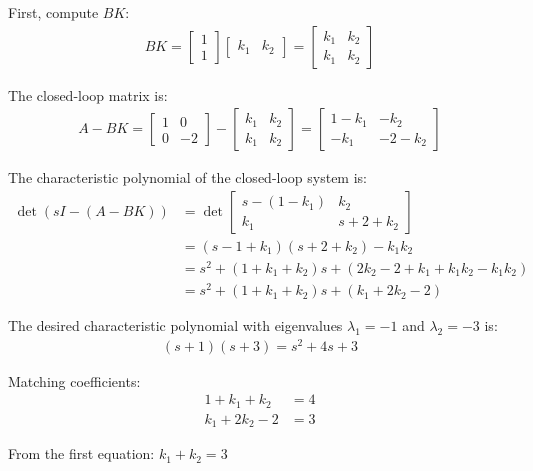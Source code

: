 \documentclass[11pt,a4paper]{article}
\begin{document}
First, compute $BK$:
\begin{align}
  BK = \begin{bmatrix} 1 \\ 1 \end{bmatrix}\begin{bmatrix} k_1 & k_2 \end{bmatrix} = \begin{bmatrix} k_1 & k_2 \\ k_1 & k_2 \end{bmatrix}
\end{align}

The closed-loop matrix is:
\begin{align}
  A - BK = \begin{bmatrix} 1 & 0 \\ 0 & -2 \end{bmatrix} - \begin{bmatrix} k_1 & k_2 \\ k_1 & k_2 \end{bmatrix} = \begin{bmatrix} 1-k_1 & -k_2 \\ -k_1 & -2-k_2 \end{bmatrix}
\end{align}

The characteristic polynomial of the closed-loop system is:
\begin{align}
  \det(sI - (A-BK)) &= \det\begin{bmatrix} s-(1-k_1) & k_2 \\ k_1 & s+2+k_2 \end{bmatrix} \\
  &= (s-1+k_1)(s+2+k_2) - k_1k_2 \\
  &= s^2 + (1+k_1+k_2)s + (2k_2 - 2 + k_1 + k_1k_2 - k_1k_2) \\
  &= s^2 + (1+k_1+k_2)s + (k_1 + 2k_2 - 2)
\end{align}

The desired characteristic polynomial with eigenvalues $\lambda_1 = -1$ and $\lambda_2 = -3$ is:
\begin{align}
  (s+1)(s+3) = s^2 + 4s + 3
\end{align}

Matching coefficients:
\begin{align}
  1 + k_1 + k_2 &= 4 \\
  k_1 + 2k_2 - 2 &= 3
\end{align}

From the first equation: $k_1 + k_2 = 3$
\end{document}
